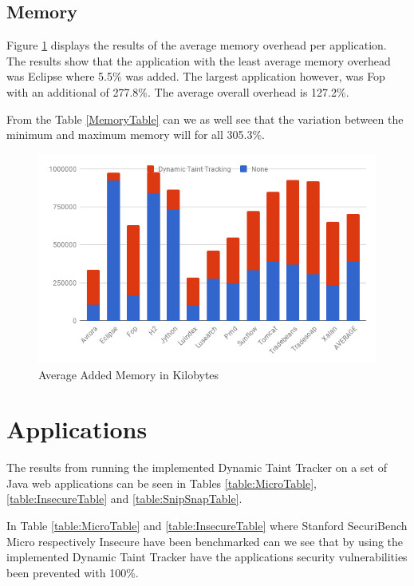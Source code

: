 \subsection{Memory}
Figure \ref{fig:Memory} displays the results of the average memory overhead per application. The results show that the application with the least average memory overhead was Eclipse where 5.5\% was added. The largest application however, was Fop with an additional of 277.8\%. The average overall overhead is 127.2\%.

From the Table \ref{MemoryTable} can we as well see that the variation between the minimum and maximum memory will for all 305.3\%.

\begin{figure}[H]
	\centering
	\includegraphics[width=\textwidth]{images/Memory.png}
	\caption{Average Added Memory in Kilobytes}
	\label{fig:Memory}
\end{figure}



\section{Applications}
The results from running the implemented Dynamic Taint Tracker on a set of Java web applications can be seen in Tables \ref{table:MicroTable}, \ref{table:InsecureTable} and \ref{table:SnipSnapTable}. 

In Table \ref{table:MicroTable} and \ref{table:InsecureTable} where Stanford SecuriBench Micro \parencite{securiBenchMicro} respectively Insecure \parencite{insecure} have been benchmarked can we see that by using the implemented Dynamic Taint Tracker have the applications security vulnerabilities been prevented with 100\%. 


